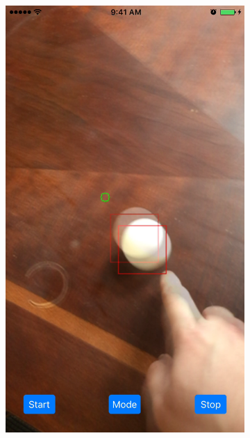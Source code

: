 \documentclass[11pt,letterpaper]{article}
\begin{document}
	\begin{figure}[h!]
		\centering
		\begin{subfigure}{.4\textwidth}
			\centering
			\includegraphics[width=1\linewidth]{toucha}
		\end{subfigure}\space\space\space\space%
		\begin{subfigure}{.4\textwidth}
			\centering

\end{subfigure}
\end{figure}
\end{document}
